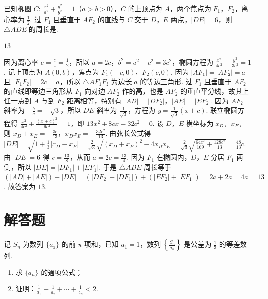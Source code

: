 \begin{problem}
已知椭圆 \(C:\ \frac{x^2}{a^2}+\frac{y^2}{b^2}=1\)（\(a>b>0\)），\(C\) 的上顶点为 \(A\)，两个焦点为 \(F_1\)，\(F_2\)，离心率为 \(\frac12\). 过 \(F_1\) 且垂直于 \(AF_2\) 的直线与 \(C\) 交于 \(D\)，\(E\) 两点，\(|DE|=6\)，则 \(\triangle ADE\) 的周长是\fillinblank{}.
\end{problem}

\begin{answer}
\(13\)
\end{answer}

\begin{solution}
因为离心率 \(e=\frac{c}{a}=\frac{1}{2}\)，所以 \(a=2c\)，\(b^2=a^2-c^2=3c^2\)，椭圆方程为 \(\frac{x^2}{4c^2}+\frac{y^2}{3c^2}=1\). 记上顶点为 \(A(0,b)\)，焦点为 \(F_1(-c,0)\)，\(F_2(c,0)\). 因为 \(\lvert AF_1\rvert=\lvert AF_2\rvert=a\) 且 \(\lvert F_1F_2\rvert=2c=a\)，所以 \(\triangle AF_1F_2\) 为边长 \(a\) 的等边三角形. 过 \(F_1\) 且垂直于 \(AF_2\) 的直线即等边三角形从 \(F_1\) 向对边 \(AF_2\) 作的高，也是 \(AF_2\) 的垂直平分线，故其上任一点到 \(A\) 与到 \(F_2\) 距离相等，特别有 \(\lvert AD\rvert=\lvert DF_2\rvert\)，\(\lvert AE\rvert=\lvert EF_2\rvert\). 因为 \(AF_2\) 斜率为 \(-\frac{b}{c}=-\sqrt{3}\)，所以 \(DE\) 斜率为 \(\frac{1}{\sqrt{3}}\)，方程为 \(y=\frac{1}{\sqrt{3}}(x+c)\). 联立椭圆方程得 \(\frac{x^2}{4c^2}+\frac{(x+c)^2}{9c^2}=1\)，即 \(13x^2+8cx-32c^2=0\). 设 \(D\)，\(E\) 横坐标为 \(x_D\)，\(x_E\)，则 \(x_D+x_E=-\frac{8c}{13}\)，\(x_Dx_E=-\frac{32c^2}{13}\). 由弦长公式得 \(\lvert DE\rvert=\sqrt{1+\frac{1}{3}}\lvert x_D-x_E\rvert=\frac{2}{\sqrt{3}}\sqrt{(x_D+x_E)^2-4x_Dx_E}=\frac{2}{\sqrt{3}}\sqrt{\frac{64c^2}{169}+\frac{128c^2}{13}}=\frac{48}{13}c\). 由 \(\lvert DE\rvert=6\) 得 \(c=\frac{13}{8}\)，从而 \(a=2c=\frac{13}{4}\). 因为 \(F_1\) 在椭圆内，\(D\)，\(E\) 分居 \(F_1\) 两侧，所以 \(\lvert DE\rvert=\lvert DF_1\rvert+\lvert EF_1\rvert\). 于是 \(\triangle ADE\) 周长等于 \((\lvert AD\rvert+\lvert AE\rvert)+\lvert DE\rvert=(\lvert DF_2\rvert+\lvert DF_1\rvert)+(\lvert EF_2\rvert+\lvert EF_1\rvert)=2a+2a=4a=13\). 故答案为 \(13\).
\end{solution}
\section{解答题}

\begin{problem}
记 \(S_n\) 为数列 \(\{a_n\}\) 的前 \(n\) 项和，已知 \(a_1=1\)，数列 \(\left\{\frac{S_n}{a_n}\right\}\) 是公差为 \(\frac13\) 的等差数列.

\begin{enumerate}
\item 求 \(\{a_n\}\) 的通项公式；

\item 证明：\(\frac1{a_1}+\frac1{a_2}+\cdots+\frac1{a_n}<2\).
\end{enumerate}
\end{problem}

